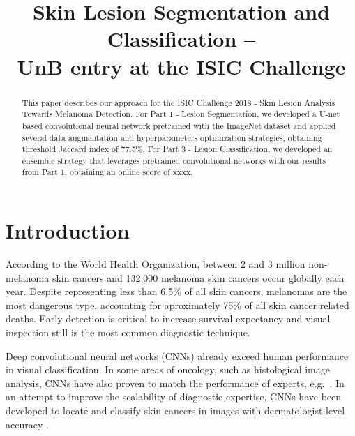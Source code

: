 \documentclass[conference]{IEEEtran}
\begin{document}
\title{Skin Lesion Segmentation and Classification --\\
  UnB entry at the ISIC Challenge}

\author{
}

\maketitle


\begin{abstract}
  This paper describes our approach for the ISIC Challenge 2018 - Skin Lesion Analysis Towards Melanoma Detection. For Part 1 - Lesion Segmentation, we developed a U-net based convolutional neural network pretrained with the ImageNet dataset%
  and applied several data augmentation and hyperparameters optimization strategies, obtaining threshold Jaccard index of 77.5\%. For Part 3 - Lesion Classification, we developed an ensemble strategy that leverages pretrained convolutional networks with our results from Part 1, obtaining an online score of xxxx. 
\end{abstract}

\section{Introduction}

According to the World Health Organization, between 2 and 3 million non-melanoma skin cancers and 132,000 melanoma skin cancers occur globally each year\cite{who}. Despite representing less than 6.5\% of all skin cancers, melanomas are the most dangerous type, accounting for aproximately 75\% of all skin cancer related deaths\cite{who,nature}.
Early detection is critical to increase survival expectancy and visual inspection still is the most common diagnostic technique.

Deep convolutional neural networks (CNNs) already exceed human performance in visual classification\cite{fei}.
In some areas of oncology, such as histological image analysis, CNNs have also proven to match the performance of experts, e.g.\ \cite{veta_etal_mia2015}.
In an attempt to improve the scalability of diagnostic expertise, CNNs have been developed to locate and classify skin cancers in images with dermatologist-level accuracy \cite{nature}.
\end{document}
